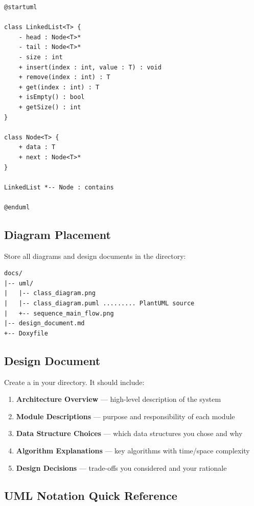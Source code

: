 \begin{lstlisting}[style=plaintext]
@startuml

class LinkedList<T> {
    - head : Node<T>*
    - tail : Node<T>*
    - size : int
    + insert(index : int, value : T) : void
    + remove(index : int) : T
    + get(index : int) : T
    + isEmpty() : bool
    + getSize() : int
}

class Node<T> {
    + data : T
    + next : Node<T>*
}

LinkedList *-- Node : contains

@enduml
\end{lstlisting}

\subsection{Diagram Placement}

Store all diagrams and design documents in the  directory:

\begin{lstlisting}[style=tree]
docs/
|-- uml/
|   |-- class_diagram.png
|   |-- class_diagram.puml ......... PlantUML source
|   +-- sequence_main_flow.png
|-- design_document.md
+-- Doxyfile
\end{lstlisting}

\subsection{Design Document}

Create a  in your  directory. It should include:

\begin{enumerate}
  \item \textbf{Architecture Overview} --- high-level description of the system
  \item \textbf{Module Descriptions} --- purpose and responsibility of each module
  \item \textbf{Data Structure Choices} --- which data structures you chose and why
  \item \textbf{Algorithm Explanations} --- key algorithms with time/space complexity
  \item \textbf{Design Decisions} --- trade-offs you considered and your rationale
\end{enumerate}

\subsection{UML Notation Quick Reference}

